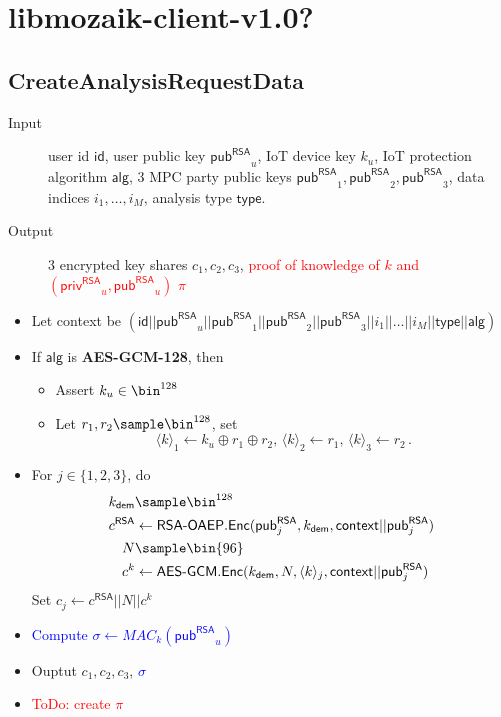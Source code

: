 \documentclass[10pt,a4paper]{article}
\newcommand{\pub}{\ensuremath{\mathsf{pub}}}
\newcommand{\priv}{\ensuremath{\mathsf{priv}}}
\newcommand{\pubRSA}{\ensuremath{\pub^{\mathsf{RSA}}}}
\newcommand{\privRSA}{\ensuremath{\priv^{\mathsf{RSA}}}}
\newcommand{\id}{\ensuremath{\mathsf{id}}}
\newcommand{\type}{\ensuremath{\mathsf{type}}}
\newcommand{\alg}{\ensuremath{\mathsf{alg}}}
\newcommand{\kdem}{\ensuremath{k_{\mathsf{dem}}}}
\newcommand{\share}[1]{\ensuremath{\langle #1 \rangle}}
\newcommand{\AlgAESGCM}{\textsf{\textbf{AES-GCM-128}}}
\newcommand{\RSAOAEP}{\ensuremath{\textsf{RSA-OAEP}}}
\newcommand{\AESGCM}{\ensuremath{\textsf{AES-GCM}}}
\newcommand{\Encrypt}{\ensuremath{\textsf{Enc}}}
\begin{document}
{\color{gray}
\section{libmozaik-client-v1.0?}

\subsection{CreateAnalysisRequestData}
\begin{description}
	\item[Input] user id $\id$, user public key $\pubRSA_u$, IoT device key $k_u$, IoT protection algorithm $\alg$, 3 MPC party public keys $\pubRSA_1, \pubRSA_2, \pubRSA_3$, data indices $i_1, \dots, i_M$, analysis type $\type$.
	\item[Output] 3 encrypted key shares $c_1, c_2, c_3$, \textcolor{red}{proof of knowledge of $k$ and $(\privRSA_u, \pubRSA_u)$ $\pi$}
\end{description}
\begin{itemize}
	\item Let context be $(\id||\pubRSA_u||\pubRSA_1||\pubRSA_2||\pubRSA_3||i_1||\dots||i_M||\type||\alg)$
	\item If $\alg$ is \AlgAESGCM, then
	\begin{itemize}
		\item Assert $k_u \in \bin^{128}$
		\item Let $r_1, r_2 \sample \bin^{128}$, set
		\[
		\share{k}_1 \gets k_u \oplus r_1 \oplus r_2,\, \share{k}_2 \gets r_1,\, \share{k}_3 \gets r_2 \,.
		\]
	\end{itemize}
	\item For $j \in \{1,2,3\}$, do
	\begin{align*}
		\kdem & \sample \bin^{128} \\
		c^{\mathsf{RSA}} & \gets \RSAOAEP.\Encrypt(\pubRSA_j, \kdem, \mathsf{context}||\pubRSA_j) \\
		N & \sample \bin{96} \\
		c^k & \gets \AESGCM.\Encrypt(\kdem,N,\share{k}_j,\mathsf{context}||\pubRSA_j)
	\end{align*}
	Set $c_j \gets c^{\mathsf{RSA}}||N||c^k$
	\item \textcolor{blue}{Compute $\sigma \gets MAC_k(\pubRSA_u)$}
	\item Ouptut $c_1, c_2, c_3$, \textcolor{blue}{$\sigma$}
	\item \textcolor{red}{ToDo: create $\pi$}
\end{itemize}

}
\end{document}

